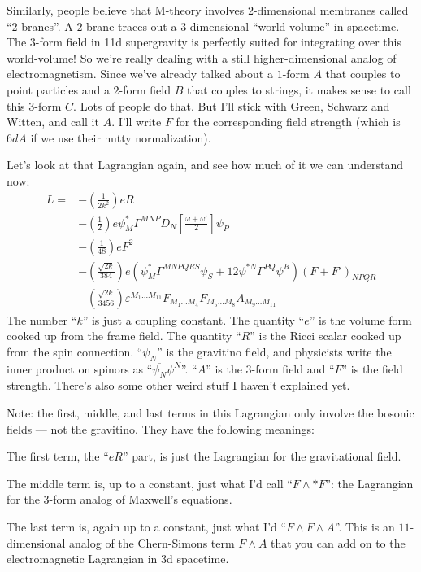 \documentclass{article}
\begin{document}
Similarly, people believe that M-theory involves \(2\)-dimensional
membranes called ``2-branes''. A \(2\)-brane traces out a
\(3\)-dimensional ``world-volume'' in spacetime. The \(3\)-form field in
11d supergravity is perfectly suited for integrating over this
world-volume! So we're really dealing with a still higher-dimensional
analog of electromagnetism. Since we've already talked about a
\(1\)-form \(A\) that couples to point particles and a \(2\)-form field
\(B\) that couples to strings, it makes sense to call this \(3\)-form
\(C\). Lots of people do that. But I'll stick with Green, Schwarz and
Witten, and call it \(A\). I'll write \(F\) for the corresponding field
strength (which is \(6dA\) if we use their nutty normalization).

Let's look at that Lagrangian again, and see how much of it we can
understand now: \[
  \begin{aligned}
    L =
    &- \left(\frac{1}{2k^2}\right) eR
  \\&- \left(\frac{1}{2}\right) e\psi_M^* \Gamma^{MNP} D_N\left[\frac{\omega+\omega'}{2}\right]\psi_P
  \\&- \left(\frac{1}{48}\right) eF^2
  \\&- \left(\frac{\sqrt{2k}}{384}\right) e(\psi_M^* \Gamma^{MNPQRS}\psi_S + 12\psi^{*N}\Gamma^{PQ}\psi^R)(F+F')_{NPQR}
  \\&- \left(\frac{\sqrt{2k}}{3456}\right) \varepsilon^{M_1\ldots M_{11}}F_{M_1\ldots M_4}F_{M_5\ldots M_8}A_{M_9\ldots M_{11}}
  \end{aligned}
\] The number ``\(k\)'' is just a coupling constant. The quantity
``\(e\)'' is the volume form cooked up from the frame field. The
quantity ``\(R\)'' is the Ricci scalar cooked up from the spin
connection. ``\(\psi_N\)'' is the gravitino field, and physicists write
the inner product on spinors as ``\(\overline{\psi_N} \psi^N\)''.
``\(A\)'' is the \(3\)-form field and ``\(F\)'' is the field strength.
There's also some other weird stuff I haven't explained yet.

Note: the first, middle, and last terms in this Lagrangian only involve
the bosonic fields --- not the gravitino. They have the following
meanings:

The first term, the ``\(e R\)'' part, is just the Lagrangian for the
gravitational field.

The middle term is, up to a constant, just what I'd call
``\(F\wedge*F\)'': the Lagrangian for the \(3\)-form analog of Maxwell's
equations.

The last term is, again up to a constant, just what I'd
``\(F\wedge F\wedge A\)''. This is an \(11\)-dimensional analog of the
Chern-Simons term \(F\wedge A\) that you can add on to the
electromagnetic Lagrangian in 3d spacetime.
\end{document}
